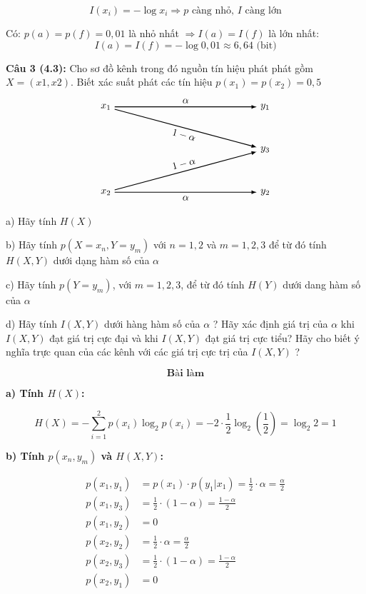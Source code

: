 \documentclass[12pt]{article}
\begin{document}
\[
I(x_i) = -\log x_i
\Rightarrow p \text{ càng nhỏ, } I \text{ càng lớn}
\]

Có: $p(a) = p(f) = 0{,}01$ là nhỏ nhất 
$\Rightarrow I(a) = I(f)$ là lớn nhất: 
\[
I(a) = I(f) = - \log 0{,}01 \approx 6{,}64 \text{ (bit)}
\]

\newpage
\textbf{Câu 3 (4.3):} Cho sơ đồ kênh trong đó nguồn tín hiệu phát phát gồm $X=(x1,x2)$. Biết xác suất phát các tín hiệu $p(x_1)=p(x_2)=0,5$
\[
\begin{tikzpicture}[>=latex, thick]

\node[left] (x1) at (0,3) {$x_1$};
\node[left] (x2) at (0,0) {$x_2$};

\node[right] (y1) at (5,3) {$y_1$};
\node[right] (y3) at (5,1.5) {$y_3$};
\node[right] (y2) at (5,0) {$y_2$};

\draw[->] (x1) -- (y1) node[midway, above] {$\alpha$};
\draw[->] (x1) -- (y3) node[midway, sloped, below] {$1 - \alpha$};

\draw[->] (x2) -- (y2) node[midway, below] {$\alpha$};
\draw[->] (x2) -- (y3) node[midway, sloped, above] {$1 - \alpha$};

\end{tikzpicture}
\]

a) Hãy tính $H(X)$

b) Hãy tính $p(X=x_n,Y=y_m)$ với $n=1,2$ và $m=1,2,3$ để từ đó tính $H(X,Y)$ dưới dạng hàm số của $\alpha$

c) Hãy tính $p(Y=y_m)$, với $m=1,2,3$, để từ đó tính $H(Y)$ dưới dang hàm số của $\alpha$ 

d) Hãy tính $I(X,Y)$ dưới hàng hàm số của $\alpha$ ? Hãy xác định giá trị của $\alpha$ khi $I(X,Y)$ đạt giá trị cực đại và khi $I(X,Y)$ đạt giá trị cực tiểu? Hãy cho biết ý nghĩa trực quan của các kênh với các giá trị cực trị của $I(X,Y)$ ?

\[
\textbf{Bài làm}
\]

\textbf{a) Tính $H(X)$:}

\[
H(X) = - \sum_{i=1}^{2} p(x_i) \log_2 p(x_i) = -2 \cdot \frac{1}{2} \log_2 \left( \frac{1}{2} \right) = \log_2 2 = 1
\]

\textbf{b) Tính $p(x_n, y_m)$ và $H(X,Y)$:}

\[
\begin{aligned}
p(x_1, y_1) &= p(x_1) \cdot p(y_1|x_1) = \frac{1}{2} \cdot \alpha = \frac{\alpha}{2} \\
p(x_1, y_3) &= \frac{1}{2} \cdot (1 - \alpha) = \frac{1 - \alpha}{2} \\
p(x_1, y_2) &= 0 \\
p(x_2, y_2) &= \frac{1}{2} \cdot \alpha = \frac{\alpha}{2} \\
p(x_2, y_3) &= \frac{1}{2} \cdot (1 - \alpha) = \frac{1 - \alpha}{2} \\
p(x_2, y_1) &= 0
\end{aligned}
\]
\end{document}
